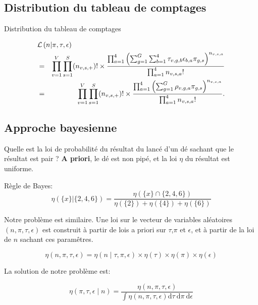 \documentclass{beamer}
\newcommand{\fr}[1]{#1}
\newcommand{\en}[1]{}
\begin{document}
\subsection{\fr{Distribution du tableau de comptages}\en{Distribution of the counts}}
\begin{frame}{\fr{Distribution du tableau de comptages}\en{Distribution of the counts}}
    
\begin{eqnarray*}\lefteqn{\mathcal{L}\left(n | \pi, \tau,\epsilon \right)}\nonumber\\& =& \prod_{v=1}^{V} \prod_{s = 1}^{S} (n_{v,s,+})!\times\frac{\prod_{a = 1}^{4} \left( \sum_{g = 1}^{G}\sum_{b=1}^{4} \tau_{v,g,b}\epsilon_{b,a} \pi_{g,s}  \right)^{n_{v,s,a}}}{\prod_{a = 1}^{4}n_{v,s,a}!}\nonumber\\
& =&\prod_{v=1}^{V} \prod_{s = 1}^{S} (n_{v,s,+})!\times\frac{\prod_{a = 1}^{4} \left( \sum_{g = 1}^{G} \rho_{v,g,a} \pi_{g,s}  \right)^{n_{v,s,a}}}{\prod_{a = 1}^{4}n_{v,s,a}!}.\label{eq:likelihood}\end{eqnarray*}
\end{frame}

\subsection{\fr{Approche bayesienne}}
\begin{frame}{\en{Approche bayesienne}}
\fr{Quelle est la loi de probabilité du résultat du lancé d'un dé sachant que le résultat est pair ?
{\bf A priori}, le dé est non pipé, et la loi $\eta$ du résultat est uniforme.
}

\end{frame}
\begin{frame}{\en{Approche bayesienne (2)}}
\fr{Règle de Bayes:}
$$\eta(\{x\}|\{2,4,6\})=\frac{\eta(\{x\}\cap\{2,4,6\})}{\eta(\{2\})+\eta(\{4\})+\eta(\{6\})}$$
\end{frame}
\begin{frame}{}
\fr{Notre problème est similaire. Une loi sur le vecteur de variables aléatoires }$(n,\pi,\tau,\epsilon)$
\fr{est construit à partir de lois a priori sur }$\tau$,$\pi$ \fr{et}\en{and} $\epsilon$, \fr{et à partir de la loi de $n$ sachant ces paramêtres.}

$$\eta(n,\pi,\tau,\epsilon)=  \eta(n\mid \tau,\pi,\epsilon)\times\eta(\tau)\times\eta(\pi)\times\eta(\epsilon)$$

La solution de notre problème est:

$$\eta(\pi,\tau,\epsilon\mid n)=\frac{\eta(n,\pi,\tau,\epsilon)}{\int \eta(n,\pi,\tau,\epsilon) \mathrm{d}\tau~\mathrm{d}\pi~\mathrm{d}\epsilon}$$


\end{frame}
\end{document}
